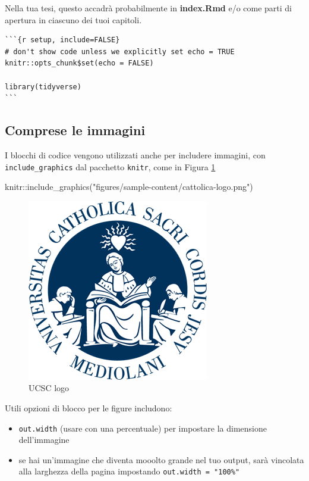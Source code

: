 \documentclass[a4paper, 11pt, nobind]{templates/ociamthesis}
\providecommand{\tightlist}{%
  \setlength{\itemsep}{0pt}\setlength{\parskip}{0pt}}
\newenvironment{Shaded}{\begin{snugshade}}{\end{snugshade}}
\newcommand{\FunctionTok}[1]{\textcolor[rgb]{0.00,0.00,0.00}{#1}}
\newcommand{\NormalTok}[1]{#1}
\newcommand{\SpecialCharTok}[1]{\textcolor[rgb]{0.00,0.00,0.00}{#1}}
\newcommand{\StringTok}[1]{\textcolor[rgb]{0.31,0.60,0.02}{#1}}
\renewenvironment{Shaded}
{
  \vspace{10pt}%
  \begin{snugshade}%
}{%
  \end{snugshade}%
  \vspace{8pt}%
}
\begin{document}
Nella tua tesi, questo accadrà probabilmente in \textbf{index.Rmd} e/o come parti di apertura in ciascuno dei tuoi capitoli.

\begin{verbatim}
```{r setup, include=FALSE}
# don't show code unless we explicitly set echo = TRUE
knitr::opts_chunk$set(echo = FALSE)

library(tidyverse)
```
\end{verbatim}

\hypertarget{comprese-le-immagini}{%
\subsection{Comprese le immagini}\label{comprese-le-immagini}}

I blocchi di codice vengono utilizzati anche per includere immagini, con \texttt{include\_graphics} dal pacchetto \texttt{knitr}, come in Figura \ref{fig:catto-logo}

\begin{Shaded}
\begin{Highlighting}[]
\NormalTok{knitr}\SpecialCharTok{::}\FunctionTok{include\_graphics}\NormalTok{(}\StringTok{"figures/sample{-}content/cattolica{-}logo.png"}\NormalTok{)}
\end{Highlighting}
\end{Shaded}

\begin{figure}

{\centering \includegraphics[width=0.5\linewidth]{figures/sample-content/cattolica-logo} 

}

\caption{UCSC logo}\label{fig:catto-logo}
\end{figure}

Utili opzioni di blocco per le figure includono:

\begin{itemize}
\tightlist
\item
  \texttt{out.width} (usare con una percentuale) per impostare la dimensione dell'immagine
\item
  se hai un'immagine che diventa mooolto grande nel tuo output, sarà vincolata alla larghezza della pagina impostando \texttt{out.width\ =\ "100\%"}
\end{itemize}
\end{document}
